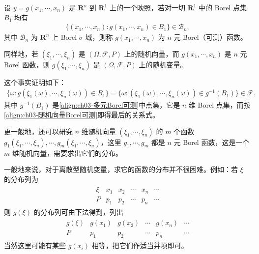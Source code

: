 \documentclass[../../main.tex]{subfiles}
\begin{document}
\begin{definition}\label{definition:ch03-多元Borel可测函数}
设 $y=g(x_1,\cdots,x_n)$ 是 $\mathbf{R}^{n}$ 到 $\mathbf{R}^{1}$ 上的一个映照，若对一切 $\mathbf{R}^{1}$ 中的 Borel 点集 $B_1$ 均有
\begin{align}
\{(x_1,\cdots,x_n):g(x_1,\cdots,x_n)\in B_1\}\in\mathscr{B}_n,\label{align:ch03-多元Borel可测}
\end{align}
其中 $\mathscr{B}_n$ 为 $\mathbf{R}^{n}$ 上 Borel $\sigma$ 域，则称 $g(x_1,\cdots,x_n)$ 为 $n$ 元 Borel（可测）函数。
\end{definition}

同样地，若 $(\xi_1,\cdots,\xi_n)$ 是 $(\Omega,\mathscr{F},P)$ 上的随机向量，而 $g(x_1,\cdots,x_n)$ 是 $n$ 元 Borel 函数，则 $g(\xi_1,\cdots,\xi_n)$ 是 $(\Omega,\mathscr{F},P)$ 上的随机变量。

这个事实证明如下：
\begin{align*}
\{\omega:g(\xi_1(\omega),\cdots,\xi_n(\omega))\in B_1\}
=\{\omega:(\xi_1(\omega),\cdots,\xi_n(\omega))\in g^{-1}(B_1)\}\in\mathscr{F}.
\end{align*}
其中 $g^{-1}(B_1)$ 是\eqref{align:ch03-多元Borel可测}中点集，它是 $n$ 维 Borel 点集，而按\eqref{align:ch03-随机向量Borel可测}即得最后的关系式。

更一般地，还可以研究 $n$ 维随机向量 $(\xi_1,\cdots,\xi_n)$ 的 $m$ 个函数 $g_1(\xi_1,\cdots,\xi_n),\cdots,g_m(\xi_1,\cdots,\xi_n)$，这里 $g_1,\cdots,g_m$ 都是 $n$ 元 Borel 函数，这是一个 $m$ 维随机向量，需要求出它们的分布。

一般地来说，对于离散型随机变量，求它的函数的分布并不很困难。例如：若 $\xi$ 的分布列为
\begin{align*}\begin{array}{c|cccccc}
\xi & x_1 & x_2 & \cdots & x_n & \cdots\\
\hline
P & p_1 & p_2 & \cdots & p_n & \cdots
\end{array}\end{align*}
则 $g(\xi)$ 的分布列可由下法得到，列出
\begin{align}
\begin{array}{c|cccccc}
g(\xi) & g(x_1) & g(x_2) & \cdots & g(x_n) & \cdots\\
\hline
P & p_1 & p_2 & \cdots & p_n & \cdots
\end{array}\label{align:ch03-函数分布列}
\end{align}
当然这里可能有某些 $g(x_i)$ 相等，把它们作适当并项即可。
\end{document}
